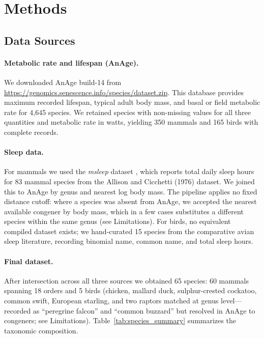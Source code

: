\documentclass{article}
\begin{document}

\section{Methods}
\label{sec:methods}

\subsection{Data Sources}
\label{sec:data}

\paragraph{Metabolic rate and lifespan (AnAge).}
We downloaded AnAge build-14 from \url{https://genomics.senescence.info/species/dataset.zip}.
This database provides maximum recorded lifespan, typical adult body mass, and basal or
field metabolic rate for 4,645 species. We retained species with non-missing values for
all three quantities and metabolic rate in watts, yielding 350 mammals and 165 birds
with complete records.

\paragraph{Sleep data.}
For mammals we used the \emph{msleep} dataset \citep{allison1976}, which reports total
daily sleep hours for 83 mammal species from the Allison and Cicchetti (1976) dataset.
We joined this to AnAge by genus and nearest log body mass. The pipeline applies no
fixed distance cutoff: where a species was absent from AnAge, we accepted the nearest
available congener by body mass, which in a few cases substitutes a different species
within the same genus (see Limitations). For birds, no equivalent compiled dataset
exists; we hand-curated 15 species from the comparative avian sleep literature,
recording binomial name, common name, and total sleep hours.

\paragraph{Final dataset.}
After intersection across all three sources we obtained 65 species: 60 mammals spanning
18 orders and 5 birds (chicken, mallard duck, sulphur-crested cockatoo, common swift,
European starling, and two raptors matched at genus level---recorded as ``peregrine
falcon'' and ``common buzzard'' but resolved in AnAge to congeners; see Limitations).
Table~\ref{tab:species_summary} summarizes the taxonomic composition.
\end{document}
